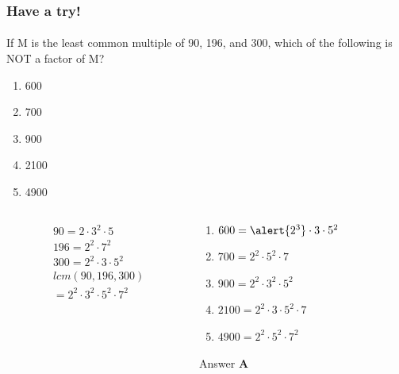 \documentclass[
	11pt, %
	handout,
]{beamer}
\begin{document}
\begin{frame}
	\frametitle{Have a try!}
	\framesubtitle{}
		If M is the least common multiple of 90, 196, and 300, which of the following is NOT a factor of M?
		 \begin{enumerate}[A]
		 	\item 600
		 	\item 700
		 	\item  900
		 	\item 2100
		 	\item 4900
		 	\end{enumerate}

		 	\pause 


	\begin{columns}[t] %
		\begin{column}{0.45\textwidth} %
						\begin{equation*}
					\begin{split}
					&90 = 2 \cdot 3^2 \cdot 5 \\
			 		&196 = 2^2 \cdot 7^2 \\
			 		&300 =  2^2 \cdot 3 \cdot 5^2 \\
			 		&lcm(90, 196, 300) \\ &= 2^2 \cdot 3^2 \cdot 5^2\cdot 7^2   
					\end{split}
				\end{equation*}

		\end{column}
		\begin{column}{0.5\textwidth} %
						\begin{enumerate}[A]
		 	\item $600 = \alert{2^3} \cdot 3 \cdot 5^2$
		 	\item $700 = 2^2 \cdot 5^2 \cdot 7 $
		 	\item  $900 = 2^2 \cdot 3^2 \cdot 5^2$
		 	\item $2100 = 2^2 \cdot 3 \cdot  5^2  \cdot 7$
		 	\item $4900 = 2^2 \cdot 5^2 \cdot 7^2$
		 	\end{enumerate} 
		 	Answer \textbf{A}
		\end{column}
	\end{columns}
\end{frame}


\end{document}
